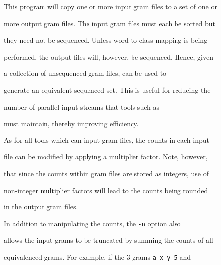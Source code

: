 %




%




%





\newpage














This program will copy one or more input gram files to a set of one or


more output gram files. The input gram files must each be sorted but


they need not be sequenced. Unless word-to-class mapping is being


performed, the output files will, however, be sequenced. Hence, given


a collection of unsequenced gram files,  can be used to


generate an equivalent sequenced set. This is useful for reducing the


number of parallel input streams that tools such as 


must maintain, thereby improving efficiency.





As for all tools which can input gram files, the counts in each input


file can be modified by applying a multiplier factor.  Note, however,


that since the counts within gram files are stored as integers, use of


non-integer multiplier factors will lead to the counts being rounded


in the output gram files.





In addition to manipulating the counts, the \texttt{-n} option also


allows the input grams to be truncated by summing the counts of all


equivalenced grams. For example, if the 3-grams \texttt{a x y 5} and


